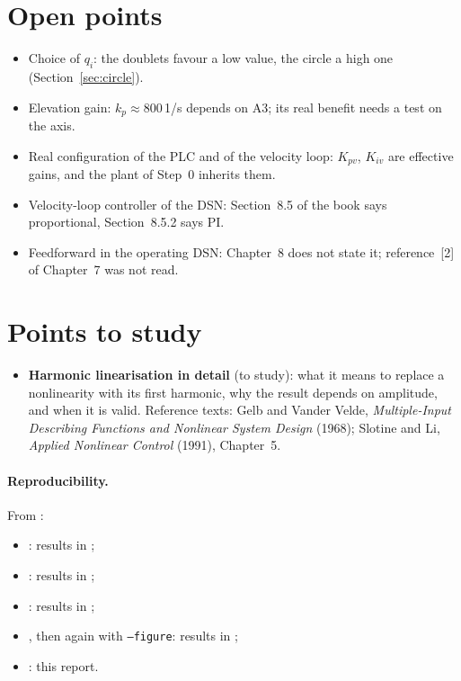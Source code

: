 \documentclass[10pt,a4paper]{article}
\numberwithin{equation}{section}
\begin{document}


\section{Open points}
\begin{itemize}
\item Choice of $q_i$: the doublets favour a low value, the circle a high one (Section~\ref{sec:circle}).
\item Elevation gain: $k_p\approx800$\,1/s depends on A3; its real benefit needs a test on the axis.
\item Real configuration of the PLC and of the velocity loop: $K_{pv}$, $K_{iv}$ are effective gains, and the plant of Step~0 inherits them.
\item Velocity-loop controller of the DSN: Section~8.5 of the book says proportional, Section~8.5.2 says PI.
\item Feedforward in the operating DSN: Chapter~8 does not state it; reference~[2] of Chapter~7 was not read.
\end{itemize}

\section{Points to study}
\begin{itemize}
\item \textbf{Harmonic linearisation in detail} (to study): what it means to replace a nonlinearity with its first harmonic, why the result depends on amplitude, and when it is valid. Reference texts: Gelb and Vander Velde, \emph{Multiple-Input Describing Functions and Nonlinear System Design} (1968); Slotine and Li, \emph{Applied Nonlinear Control} (1991), Chapter~5.
\end{itemize}

\paragraph{Reproducibility.} From :
\begin{itemize}
\item {}: results in ;
\item {}: results in ;
\item {}: results in ;
\item {}, then again with \texttt{--figure}: results in ;
\item {}: this report.
\end{itemize}
\end{document}
